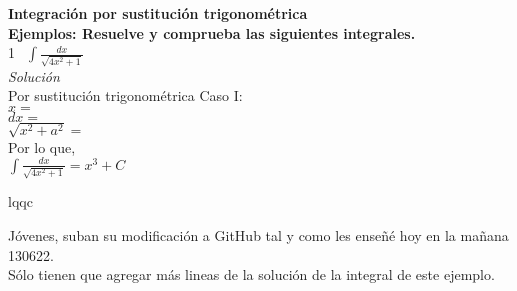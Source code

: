 \documentclass[12pt,a4paper]{article}
\begin{document}
{\bf Integración por sustitución trigonométrica}\\

{\bf Ejemplos: Resuelve y comprueba las siguientes integrales.}\\

\textcircled{1}\ $\displaystyle{\int\frac{dx}{\sqrt{4x^2+1}}}$\\

{\it Solución}\\

Por sustitución trigonométrica Caso I:\\
$x=$\\
$dx=$\\
$\sqrt{x^2+a^2}=$\\

Por lo que,\\
$\displaystyle{\int\frac{dx}{\sqrt{4x^2+1}}}=x^3+C$\\
\begin{flushright}
lqqc
\end{flushright}

Jóvenes, suban su modificación a GitHub tal y como les enseñé hoy en la mañana 130622.\\ Sólo tienen que agregar más lineas de la solución de la integral de este ejemplo.
\end{document}
